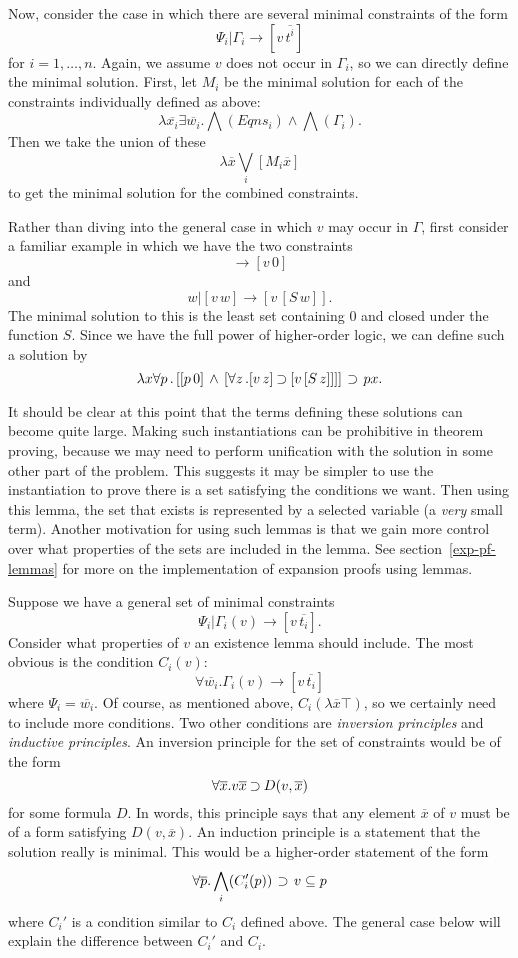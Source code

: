 Now, consider the case in which there are several minimal constraints of the form
$$\Psi_i | \Gamma_i \rightarrow [v\, \overline{t^i}]$$
for $i=1,\ldots,n$.  Again, we assume $v$ does not occur in $\Gamma_i$,
so we can directly define the minimal solution.
First, let $M_i$ be the minimal solution for each of the
constraints individually defined as above:
$$\lambda \overline{x_i} \exists \overline{w_i} .
   \bigwedge(Eqns_i) \wedge \bigwedge(\Gamma_i).$$
Then we take the union of these
$$\lambda \overline{x} \bigvee_i [M_i \overline{x}]$$
to get the minimal solution for the combined constraints.

Rather than diving into the general case in which $v$ may occur in $\Gamma$,
first consider a familiar example in which we have the two constraints
$$\rightarrow [v\, 0]$$
and
$$w | [v\, w] \rightarrow [v\, [S\, w]].$$
The minimal solution to this is the least set containing
$0$ and closed under the function $S$.  Since we have the
full power of higher-order logic, we can define such a solution
by
$$\lambda x \forall p \, .\, [[p\, 0]\,\land\,[\forall z\, . [v\, z] \mathbin{\supset} [v\, [S\, z]]]]
\,\mathbin{\supset}\, p x.$$

It should be clear at this point that the terms defining these
solutions can become quite large.  Making such instantiations
can be prohibitive in theorem proving, because we may need
to perform unification with the solution in some other part
of the problem.  This suggests it may be simpler to use
the instantiation to prove there is a set satisfying the
conditions we want.  Then using this lemma, the set that
exists is represented by a selected variable (a {\it very}
small term).  Another motivation for using such lemmas
is that we gain more control over what properties of the
sets are included in the lemma.
See section~\ref{exp-pf-lemmas} for more on the implementation
of expansion proofs using lemmas.

Suppose we have a general set of minimal constraints
$$\Psi_i | \Gamma_i(v)\rightarrow [v\, \overline{t_i}].$$
Consider what properties of $v$ an existence lemma should include.
The most obvious is the condition $C_i(v)$:
$$\forall \overline{w_i} . \Gamma_i(v)\rightarrow [v\, \overline{t_i}]$$
where $\Psi_i = \overline{w_i}$.  Of course, as mentioned above,
$C_i(\lambda \overline{x} \top)$, so we certainly need to include more
conditions.  Two other conditions are {\it inversion principles} and
{\it inductive principles}.  An inversion principle for the set of
constraints would be of the form
$$\forall \overline{x} . v \overline{x} \mathbin{\supset} D(v,\overline{x})$$
for some formula $D$.  In words, this principle says that any
element $\overline{x}$ of $v$ must be of a form satisfying $D(v,\overline{x})$.
An induction principle is a statement that the solution really is minimal.
This would be a higher-order statement of the form
$$\forall \overline{p} . \bigwedge_i(C_i'(p))\,\mathbin{\supset}\, v\subseteq p$$
where $C_i'$ is a condition similar to $C_i$ defined above.
The general case below will explain the difference between $C_i'$
and $C_i$.

